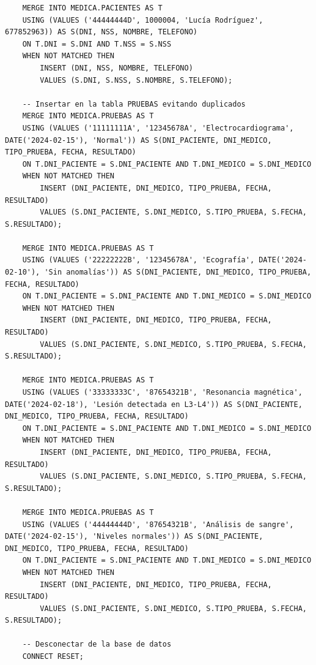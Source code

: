 \documentclass{article}
\begin{document}
\begin{verbatim}
    MERGE INTO MEDICA.PACIENTES AS T
    USING (VALUES ('44444444D', 1000004, 'Lucía Rodríguez', 677852963)) AS S(DNI, NSS, NOMBRE, TELEFONO)
    ON T.DNI = S.DNI AND T.NSS = S.NSS
    WHEN NOT MATCHED THEN
        INSERT (DNI, NSS, NOMBRE, TELEFONO)
        VALUES (S.DNI, S.NSS, S.NOMBRE, S.TELEFONO);

    -- Insertar en la tabla PRUEBAS evitando duplicados
    MERGE INTO MEDICA.PRUEBAS AS T
    USING (VALUES ('11111111A', '12345678A', 'Electrocardiograma', DATE('2024-02-15'), 'Normal')) AS S(DNI_PACIENTE, DNI_MEDICO, TIPO_PRUEBA, FECHA, RESULTADO)
    ON T.DNI_PACIENTE = S.DNI_PACIENTE AND T.DNI_MEDICO = S.DNI_MEDICO
    WHEN NOT MATCHED THEN
        INSERT (DNI_PACIENTE, DNI_MEDICO, TIPO_PRUEBA, FECHA, RESULTADO)
        VALUES (S.DNI_PACIENTE, S.DNI_MEDICO, S.TIPO_PRUEBA, S.FECHA, S.RESULTADO);

    MERGE INTO MEDICA.PRUEBAS AS T
    USING (VALUES ('22222222B', '12345678A', 'Ecografía', DATE('2024-02-10'), 'Sin anomalías')) AS S(DNI_PACIENTE, DNI_MEDICO, TIPO_PRUEBA, FECHA, RESULTADO)
    ON T.DNI_PACIENTE = S.DNI_PACIENTE AND T.DNI_MEDICO = S.DNI_MEDICO
    WHEN NOT MATCHED THEN
        INSERT (DNI_PACIENTE, DNI_MEDICO, TIPO_PRUEBA, FECHA, RESULTADO)
        VALUES (S.DNI_PACIENTE, S.DNI_MEDICO, S.TIPO_PRUEBA, S.FECHA, S.RESULTADO);

    MERGE INTO MEDICA.PRUEBAS AS T
    USING (VALUES ('33333333C', '87654321B', 'Resonancia magnética', DATE('2024-02-18'), 'Lesión detectada en L3-L4')) AS S(DNI_PACIENTE, DNI_MEDICO, TIPO_PRUEBA, FECHA, RESULTADO)
    ON T.DNI_PACIENTE = S.DNI_PACIENTE AND T.DNI_MEDICO = S.DNI_MEDICO
    WHEN NOT MATCHED THEN
        INSERT (DNI_PACIENTE, DNI_MEDICO, TIPO_PRUEBA, FECHA, RESULTADO)
        VALUES (S.DNI_PACIENTE, S.DNI_MEDICO, S.TIPO_PRUEBA, S.FECHA, S.RESULTADO);

    MERGE INTO MEDICA.PRUEBAS AS T
    USING (VALUES ('44444444D', '87654321B', 'Análisis de sangre', DATE('2024-02-15'), 'Niveles normales')) AS S(DNI_PACIENTE, DNI_MEDICO, TIPO_PRUEBA, FECHA, RESULTADO)
    ON T.DNI_PACIENTE = S.DNI_PACIENTE AND T.DNI_MEDICO = S.DNI_MEDICO
    WHEN NOT MATCHED THEN
        INSERT (DNI_PACIENTE, DNI_MEDICO, TIPO_PRUEBA, FECHA, RESULTADO)
        VALUES (S.DNI_PACIENTE, S.DNI_MEDICO, S.TIPO_PRUEBA, S.FECHA, S.RESULTADO);

    -- Desconectar de la base de datos
    CONNECT RESET;
\end{verbatim}
\end{document}
